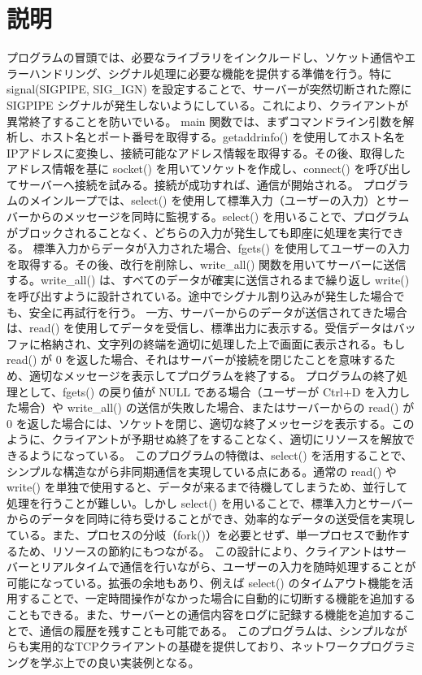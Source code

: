 \documentclass{jlreq}
\begin{document}
\section{説明}
プログラムの冒頭では、必要なライブラリをインクルードし、ソケット通信やエラーハンドリング、シグナル処理に必要な機能を提供する準備を行う。特に signal(SIGPIPE, SIG\_IGN) を設定することで、サーバーが突然切断された際に SIGPIPE シグナルが発生しないようにしている。これにより、クライアントが異常終了することを防いでいる。
main 関数では、まずコマンドライン引数を解析し、ホスト名とポート番号を取得する。getaddrinfo() を使用してホスト名をIPアドレスに変換し、接続可能なアドレス情報を取得する。その後、取得したアドレス情報を基に socket() を用いてソケットを作成し、connect() を呼び出してサーバーへ接続を試みる。接続が成功すれば、通信が開始される。
プログラムのメインループでは、select() を使用して標準入力（ユーザーの入力）とサーバーからのメッセージを同時に監視する。select() を用いることで、プログラムがブロックされることなく、どちらの入力が発生しても即座に処理を実行できる。
標準入力からデータが入力された場合、fgets() を使用してユーザーの入力を取得する。その後、改行を削除し、write\_all() 関数を用いてサーバーに送信する。write\_all() は、すべてのデータが確実に送信されるまで繰り返し write() を呼び出すように設計されている。途中でシグナル割り込みが発生した場合でも、安全に再試行を行う。
一方、サーバーからのデータが送信されてきた場合は、read() を使用してデータを受信し、標準出力に表示する。受信データはバッファに格納され、文字列の終端を適切に処理した上で画面に表示される。もし read() が 0 を返した場合、それはサーバーが接続を閉じたことを意味するため、適切なメッセージを表示してプログラムを終了する。
プログラムの終了処理として、fgets() の戻り値が NULL である場合（ユーザーが Ctrl+D を入力した場合）や write\_all() の送信が失敗した場合、またはサーバーからの read() が 0 を返した場合には、ソケットを閉じ、適切な終了メッセージを表示する。このように、クライアントが予期せぬ終了をすることなく、適切にリソースを解放できるようになっている。
このプログラムの特徴は、select() を活用することで、シンプルな構造ながら非同期通信を実現している点にある。通常の read() や write() を単独で使用すると、データが来るまで待機してしまうため、並行して処理を行うことが難しい。しかし select() を用いることで、標準入力とサーバーからのデータを同時に待ち受けることができ、効率的なデータの送受信を実現している。また、プロセスの分岐（fork()）を必要とせず、単一プロセスで動作するため、リソースの節約にもつながる。
この設計により、クライアントはサーバーとリアルタイムで通信を行いながら、ユーザーの入力を随時処理することが可能になっている。拡張の余地もあり、例えば select() のタイムアウト機能を活用することで、一定時間操作がなかった場合に自動的に切断する機能を追加することもできる。また、サーバーとの通信内容をログに記録する機能を追加することで、通信の履歴を残すことも可能である。
このプログラムは、シンプルながらも実用的なTCPクライアントの基礎を提供しており、ネットワークプログラミングを学ぶ上での良い実装例となる。
\end{document}
